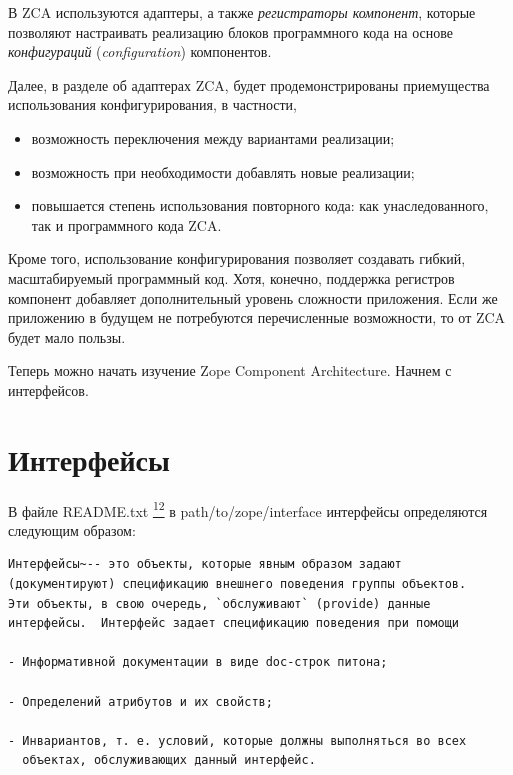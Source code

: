 \documentclass[a4paper,openany,twoside,final]{book}
\providecommand*{\DUfootnotemark}[3]{%
  \raisebox{1em}{\hypertarget{#1}{}}%
  \hyperlink{#2}{\textsuperscript{#3}}%
}
\begin{document}
В ZCA используются адаптеры, а также \emph{регистраторы компонент}, которые позволяют настраивать реализацию блоков программного кода на основе \emph{конфигураций} (\emph{configuration}) компонентов.

Далее, в разделе об адаптерах ZCA, будет продемонстрированы приемущества использования конфигурирования, в частности,

\begin{itemize}

\item возможность переключения между вариантами реализации;

\item возможность при необходимости добавлять новые реализации;

\item повышается степень использования повторного кода: как унаследованного, так и программного кода ZCA.

\end{itemize}

Кроме того, использование конфигурирования позволяет создавать гибкий, масштабируемый программный код.  Хотя, конечно, поддержка регистров компонент добавляет дополнительный уровень сложности приложения.  Если же приложению в будущем не потребуются перечисленные возможности, то от ZCA будет мало пользы.

Теперь можно начать изучение Zope Component Architecture. Начнем с интерфейсов.


\chapter{Интерфейсы%
  \label{id23}%
}


В файле README.txt\DUfootnotemark{id25}{readmes}{12} в path/to/zope/interface интерфейсы
определяются следующим образом:

\begin{verbatim}
Интерфейсы~-- это объекты, которые явным образом задают
(документируют) спецификацию внешнего поведения группы объектов.
Эти объекты, в свою очередь, `обслуживают` (provide) данные
интерфейсы.  Интерфейс задает спецификацию поведения при помощи

- Информативной документации в виде doc-строк питона;

- Определений атрибутов и их свойств;

- Инвариантов, т. е. условий, которые должны выполняться во всех
  объектах, обслуживающих данный интерфейс.
\end{verbatim}
\end{document}
